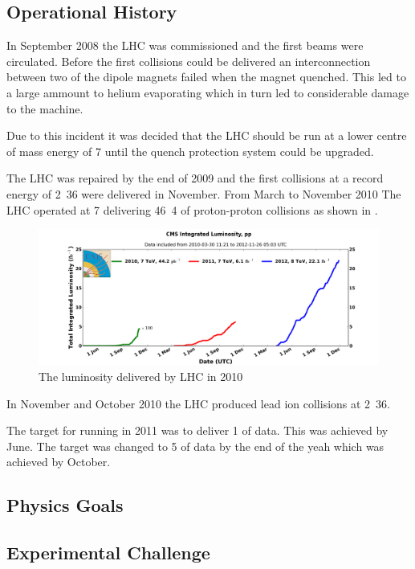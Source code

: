 \subsection{Operational History}
In September 2008 the LHC was commissioned and the first beams were circulated.
Before the first collisions could be delivered an interconnection
between two of the dipole magnets failed when the magnet quenched.
This led to a large ammount to helium evaporating which in turn led to
considerable damage to the machine.

Due to this incident it was decided that the LHC should be run at a lower centre
of mass energy of \unit{7}{\TeV} until the quench protection system could be
upgraded.

The LHC was repaired by the end of 2009 and the first collisions at a record
energy of \unit{2.36}{\TeV} were delivered in November. 
From March to November 2010 The LHC operated at \unit{7}{\TeV} delivering
\unit{46.4}{\invpb} of proton-proton collisions as shown in
.

\begin{figure}[htb!]
  \centering
  \includegraphics[width=\textwidth]{int_lumi_cumulative_pp_1.png}
  \caption{The luminosity delivered by LHC in 2010}
  \label{fig:LHC2010}
\end{figure}

In November and October 2010 the LHC produced lead ion collisions at
\unit{2.36}{\TeV}.

The target for running in 2011 was to deliver \unit{1}{\invfb} of data. This was
achieved by June. The target was changed to \unit{5}{\invfb} of data by the end
of the yeah which was achieved by October.

\subsection{Physics Goals}

\subsection{Experimental Challenge}


